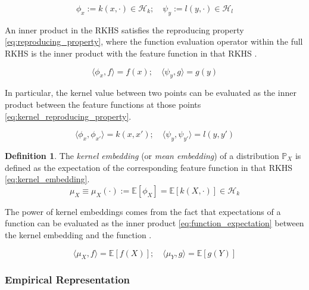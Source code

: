 \documentclass[twoside]{article} \usepackage{aistats2017}
\theoremstyle{definition}
\newtheorem{definition}{Definition}[section]
\theoremstyle{theorem}
\newcommand{\rv}[1]{{#1}}
\newcommand{\extra}[1]{{\color{ForestGreen} #1}}
\newcommand{\expect}[1]{{\mathbb{E}[#1]}}
\newcommand{\inner}[2]{{\langle #1, #2 \rangle}}
\newcommand{\Hk}{\mathcal{H}_{k}}
\newcommand{\Hl}{\mathcal{H}_{l}}
\newcommand{\muX}{\mu_{\rv{X}}}
\newcommand{\muY}{\mu_{\rv{Y}}}
\newcommand{\phiX}{\phi_{\rv{X}}}
\begin{document}
		\begin{equation}
			\phi_{x} := k(x, \cdot) \in \Hk ;\quad \psi_{y} := l(y, \cdot) \in \Hl
		\label{eq:feature_functions}
		\end{equation}

		An inner product in the RKHS satisfies the reproducing property \eqref{eq:reproducing_property}, where the function evaluation operator within the full RKHS is the inner product with the feature function in that RKHS \citep{muandet2016kernel}.

		\begin{equation}
			\inner{\phi_{x}}{f} = f(x) ;\quad \inner{\psi_{y}}{g} = g(y)
		\label{eq:reproducing_property}
		\end{equation}
		
		\extra{
		In particular, the kernel value between two points can be evaluated as the inner product between the feature functions at those points \eqref{eq:kernel_reproducing_property}.

		\begin{equation}
			\inner{\phi_{x}}{\phi_{x'}} = k(x, x') ;\quad \inner{\psi_{y}}{\psi_{y'}} = l(y, y')
		\label{eq:kernel_reproducing_property}
		\end{equation}
		}
		
		\begin{definition} \label{def:kernel_embedding}
			\citep{smola2007hilbert}
			The \textit{kernel embedding} (or \textit{mean embedding}) of a distribution $\mathbb{P}_{\rv{X}}$ is defined as the expectation of the corresponding feature function in that RKHS \eqref{eq:kernel_embedding}.
			\begin{equation}
				\muX \equiv \muX(\cdot) := \expect{\phiX} = \expect{k(\rv{X}, \cdot)} \in \Hk
			\label{eq:kernel_embedding}
			\end{equation}
		\end{definition}
		
		The power of kernel embeddings comes from the fact that expectations of a function can be evaluated as the inner product \eqref{eq:function_expectation} between the kernel embedding and the function \citep{muandet2016kernel}.
		
		\begin{equation}
			\inner{\muX}{f} = \expect{f(\rv{X})} ;\quad \inner{\muY}{g} = \expect{g(\rv{Y})}
		\label{eq:function_expectation}
		\end{equation}

		
		\subsubsection{Empirical Representation}
		\label{sec:background:kernel_embeddings:empirical_representation}
			
\end{document}
